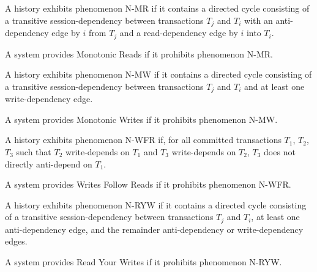 \begin{definition}
A history exhibits phenomenon N-MR if it contains a directed cycle
consisting of a transitive session-dependency between transactions
$T_j$ and $T_i$ with an anti-dependency edge by $i$ from $T_j$ and a
read-dependency edge by $i$ into $T_i$.
\end{definition}

\begin{definition}
A system provides Monotonic Reads if it prohibits phenomenon N-MR.
\end{definition}

\begin{definition}
A history exhibits phenomenon N-MW if it contains a directed cycle
consisting of a transitive session-dependency between transactions
$T_j$ and $T_i$ and at least one write-dependency edge.
\end{definition}

\begin{definition}
A system provides Monotonic Writes if it prohibits phenomenon N-MW.
\end{definition}

\begin{definition}
A history exhibits phenomenon N-WFR if, for all committed transactions
$T_1$, $T_2$, $T_3$ such that $T_2$ write-depends on $T_1$ and $T_3$
write-depends on $T_2$, $T_3$ does not directly anti-depend on $T_1$.
\end{definition}

\begin{definition}
A system provides Writes Follow Reads if it prohibits phenomenon N-WFR.
\end{definition}

\begin{definition}
A history exhibits phenomenon N-RYW if it contains a directed cycle
consisting of a transitive session-dependency between transactions
$T_j$ and $T_i$, at least one anti-dependency edge, and the remainder
anti-dependency or write-dependency edges.
\end{definition}

\begin{definition}
A system provides Read Your Writes if it prohibits phenomenon N-RYW.
\end{definition}


